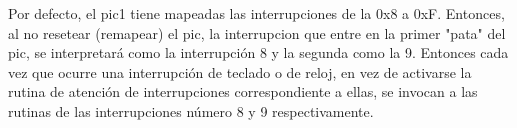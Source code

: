 Por defecto, el pic1 tiene mapeadas las interrupciones de la 0x8 a 0xF. Entonces, al no resetear (remapear) el pic, la interrupcion que entre en la primer "pata" del pic, se interpretará como la interrupción 8 y la segunda como la 9. Entonces cada vez que ocurre una interrupción de teclado o de reloj, en vez de activarse la rutina de atención de interrupciones correspondiente a ellas, se invocan a las rutinas de las interrupciones número 8 y 9 respectivamente.